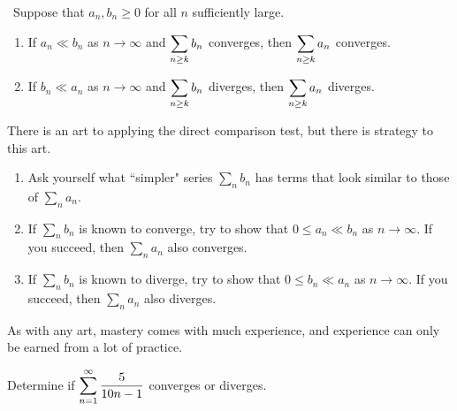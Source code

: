 \setcounter{chapter}{10}
\setcounter{section}{4}
\setcounter{theorem}{0}
\setcounter{equation}{0}


\begin{theorem}\,
Suppose that $a_n,b_n\ge 0$ for all $n$ sufficiently large.
\begin{enumerate}
\item If $a_n\ll b_n$ as $n\to\infty$ and $\displaystyle\sum_{n\ge k} b_n$ converges, then $\displaystyle\sum_{n\ge k}a_n$ converges.
\item If $b_n\ll a_n$ as $n\to\infty$ and $\displaystyle\sum_{n\ge k} b_n$ diverges, then $\displaystyle\sum_{n\ge k}a_n$ diverges.\label{direct comparison test}
\end{enumerate}
\end{theorem}
%

\begin{remark}
There is an art to applying the direct comparison test, but there is strategy to this art.
\begin{enumerate}
\item Ask yourself what ``simpler" series $\sum_n b_n$ has terms that look similar to those of $\sum_n a_n$.
\item If $\sum_n b_n$ is known to converge, try to show that $0\le a_n\ll b_n$ as $n\to\infty$.  If you succeed, then $\sum_n a_n$ also converges.
\item If $\sum_n b_n$ is known to diverge, try to show that $0\le b_n\ll a_n$ as $n\to\infty$. If you succeed, then $\sum_n a_n$ also diverges.
\end{enumerate}
As with any art, mastery comes with much experience, and experience can only be earned from a lot of practice.
\end{remark}

\newpage

\begin{example}
Determine if $\displaystyle\sum_{n=1}^\infty\frac{5}{10n-1}$ converges or diverges.
\end{example}
\ifdefined\SOLUTION
{}
\else
\fi


